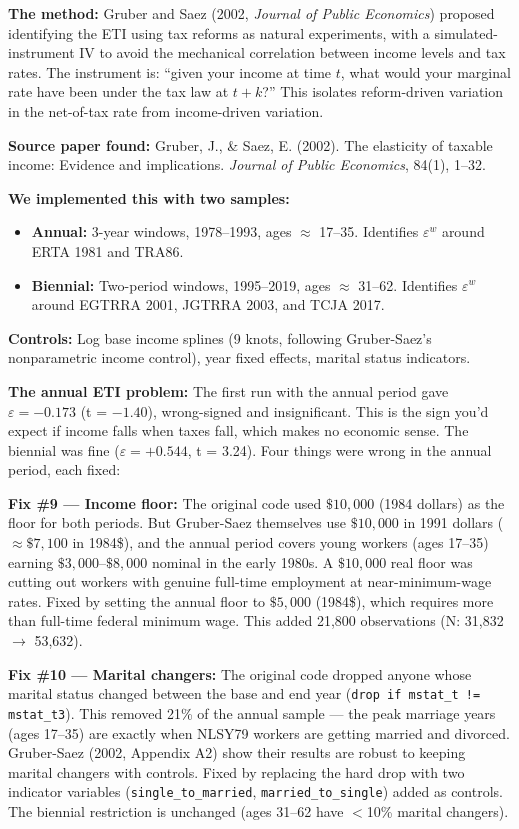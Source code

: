 \documentclass[11pt, letterpaper]{article}
\newcommand{\codebox}[1]{\texttt{\small #1}}
\begin{document}
\textbf{The method:} Gruber and Saez (2002, \textit{Journal of Public Economics}) proposed identifying the ETI using tax reforms as natural experiments, with a simulated-instrument IV to avoid the mechanical correlation between income levels and tax rates. The instrument is: ``given your income at time $t$, what would your marginal rate have been under the tax law at $t+k$?'' This isolates reform-driven variation in the net-of-tax rate from income-driven variation.

\textbf{Source paper found:} Gruber, J., \& Saez, E. (2002). The elasticity of taxable income: Evidence and implications. \textit{Journal of Public Economics}, 84(1), 1--32.

\textbf{We implemented this with two samples:}
\begin{itemize}
    \item \textbf{Annual:} 3-year windows, 1978--1993, ages $\approx$ 17--35. Identifies $\varepsilon^w$ around ERTA 1981 and TRA86.
    \item \textbf{Biennial:} Two-period windows, 1995--2019, ages $\approx$ 31--62. Identifies $\varepsilon^w$ around EGTRRA 2001, JGTRRA 2003, and TCJA 2017.
\end{itemize}

\textbf{Controls:} Log base income splines (9 knots, following Gruber-Saez's nonparametric income control), year fixed effects, marital status indicators.

\textbf{The annual ETI problem:} The first run with the annual period gave $\varepsilon = -0.173$ (t = $-1.40$), wrong-signed and insignificant. This is the sign you'd expect if income falls when taxes fall, which makes no economic sense. The biennial was fine ($\varepsilon = +0.544$, t = 3.24). Four things were wrong in the annual period, each fixed:

\textbf{Fix \#9 --- Income floor:} The original code used $\$10{,}000$ (1984 dollars) as the floor for both periods. But Gruber-Saez themselves use $\$10{,}000$ in 1991 dollars ($\approx \$7{,}100$ in 1984\$), and the annual period covers young workers (ages 17--35) earning $\$3{,}000$--$\$8{,}000$ nominal in the early 1980s. A $\$10{,}000$ real floor was cutting out workers with genuine full-time employment at near-minimum-wage rates. Fixed by setting the annual floor to $\$5{,}000$ (1984\$), which requires more than full-time federal minimum wage. This added 21,800 observations (N: 31,832 $\to$ 53,632).

\textbf{Fix \#10 --- Marital changers:} The original code dropped anyone whose marital status changed between the base and end year (\codebox{drop if mstat\_t != mstat\_t3}). This removed 21\% of the annual sample --- the peak marriage years (ages 17--35) are exactly when NLSY79 workers are getting married and divorced. Gruber-Saez (2002, Appendix A2) show their results are robust to keeping marital changers with controls. Fixed by replacing the hard drop with two indicator variables (\codebox{single\_to\_married}, \codebox{married\_to\_single}) added as controls. The biennial restriction is unchanged (ages 31--62 have $<$10\% marital changers).
\end{document}
